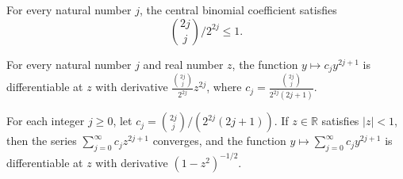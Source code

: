 \begin{lemma}
\label{FABL.centralBinomialRatio_le_one}
\leanok
{}
For every natural number $j$, the central binomial coefficient satisfies
\[\binom{2j}{j}/2^{2j}\le 1.\]
\end{lemma}

\begin{lemma}
\label{FABL.hasDerivAt_arcsinSeriesTerm}
\leanok
{}
For every natural number $j$ and real number $z$, the function $y\mapsto c_j y^{2j+1}$
is differentiable at $z$ with derivative $\frac{\binom{2j}{j}}{2^{2j}}z^{2j}$, where
$c_j=\frac{\binom{2j}{j}}{2^{2j}(2j+1)}$.
\end{lemma}

\begin{lemma}
\label{FABL.arcsinSeries_summable_and_hasDerivAt}
\leanok
{}
For each integer $j\ge 0$, let $c_j=\binom{2j}{j}/(2^{2j}(2j+1))$. If $z\in\mathbb R$
satisfies $|z|<1$, then the series $\sum_{j=0}^{\infty}c_jz^{2j+1}$ converges, and the
function $y\mapsto\sum_{j=0}^{\infty}c_jy^{2j+1}$ is differentiable at $z$ with
derivative $(1-z^2)^{-1/2}$.
\end{lemma}

